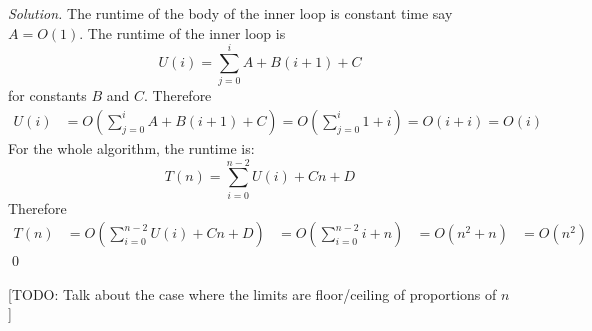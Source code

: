 \textit{Solution.}
The runtime of the body of the inner loop is constant time
say $A = O(1)$.
The runtime of the inner loop is
\[
U(i) = \sum_{j=0}^i A + B(i+1) + C
\]
for constants $B$ and $C$.
Therefore
\begin{align*}
U(i) 
&= O \left( \sum_{j=0}^i A + B(i+1) + C \right)
= O \left( \sum_{j=0}^i 1 + i \right)
= O(i + i)
= O(i)
\end{align*}
For the whole algorithm, the runtime is:
\[
T(n) = \sum_{i=0}^{n-2} U(i) + Cn + D
\]
Therefore
\begin{align*}
T(n) 
&= O \left (
         \sum_{i=0}^{n-2} U(i) + Cn + D
     \right)
&= O \left (
         \sum_{i=0}^{n-2} i + n
     \right)
&= O \left (
         n^2 + n
     \right)
&= O(n^2)
\end{align*}
\qed

\newpage



[TODO: Talk about the case where the limits are 
floor/ceiling of proportions of $n$]
